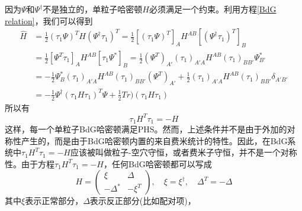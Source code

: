 \documentclass{article}
\numberwithin{equation}{subsection}
\begin{document}
因为$\Psi$和$\Psi^\dagger$不是独立的，单粒子哈密顿$H$必须满足一个约束。利用方程\eqref{BdG relation}，我们可以得到
\begin{equation}
    \begin{split}
        \hat{H}&=\frac{1}{2}(\tau_1\Psi)^TH(\Psi^\dagger\tau_1)^T=\frac{1}{2}[(\tau_1\Psi)^T]_{A}H^{AB}[(\Psi^\dagger \tau_1)^T]_{B}\\
        &=\frac{1}{2}[\Psi^T\tau_1]_AH^{AB}[\tau_1\Psi^*]_B=\frac{1}{2}(\Psi^T)_{A'}(\tau_1)_{A'A}H^{AB}(\tau_1)_{BB'}\Psi^*_{B'}\\
        &=-\frac{1}{2}\Psi_B^*(\tau_1)_{A'A}H^{AB}(\tau_1)_{BB'}(\Psi^T)_{A'}+\frac{1}{2}(\tau_1)_{A'A}H^{AB}(\tau_1)_{BB'}\delta_{A'B'}\\
        &=-\frac{1}{2}\Psi^\dagger(\tau_1 H\tau_1)^T\Psi+\frac{1}{2}Tr)(\tau_1H\tau_1)
    \end{split}
\end{equation}
所以有
\begin{equation}
    \tau_1H^T\tau_1=-H
\end{equation}
这样，每一个单粒子BdG哈密顿满足PHS。然而，上述条件并不是由于外加的对称性产生的，而是由于BdG哈密顿内置的来自费米统计的特性。因此，在BdG系统中$\tau_1 H^T\tau_1=-H$应该被叫做粒子-空穴守恒，或者费米子守恒，并不是一个对称性。由于方程$\tau_1 H^T\tau_1=-H$，任何BdG哈密顿都可以写成
\begin{equation}
    H=\begin{pmatrix}
        \xi&\Delta\\
        -\Delta^*&-\xi^T
    \end{pmatrix},\quad \xi=\xi^\dagger,\quad \Delta^T=-\Delta
\end{equation}
其中$\xi$表示正常部分，$\Delta$表示反正部分(比如配对项)，
\end{document}
